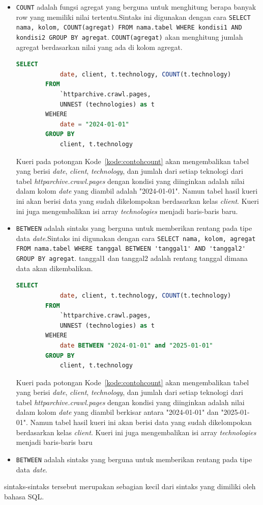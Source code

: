 \begin{itemize}
    \item \verb|COUNT| adalah fungsi agregat yang berguna untuk menghitung berapa banyak row yang memiliki nilai tertentu.Sintaks ini digunakan dengan cara \verb|SELECT nama, kolom, COUNT(agregat) FROM nama.tabel WHERE kondisi1 AND kondisi2 GROUP BY agregat|. \verb|COUNT(agregat)| akan menghitung jumlah agregat berdasarkan nilai yang ada di kolom agregat.
    \begin{lstlisting}[language=SQL, caption=contoh penggunaan sintaks \lstinline|COUNT|, label=kode:contohcount]
        SELECT
            date, client, t.technology, COUNT(t.technology)
        FROM
            `httparchive.crawl.pages,
            UNNEST (technologies) as t
        WEHERE
            date = "2024-01-01"
        GROUP BY
            client, t.technology
    \end{lstlisting}
     Kueri pada potongan Kode~\ref{kode:contohcount} akan mengembalikan tabel yang berisi \textit{date}, \textit{client}, \textit{technology}, dan jumlah dari setiap teknologi dari tabel \textit{httparchive.crawl.pages} dengan kondisi yang diinginkan adalah nilai dalam kolom \textit{date} yang diambil adalah "2024-01-01". Namun tabel hasil kueri ini akan berisi data yang sudah dikelompokan berdasarkan kelas \textit{client}. Kueri ini juga mengembalikan isi array \textit{technologies} menjadi baris-baris baru.
     
    \item \verb|BETWEEN| adalah sintaks yang berguna untuk memberikan rentang pada tipe data \textit{date}.Sintaks ini digunakan dengan cara \verb|SELECT nama, kolom, agregat FROM nama.tabel WHERE tanggal BETWEEN 'tanggal1' AND 'tanggal2' GROUP BY agregat|. tanggal1 dan tanggal2 adalah rentang tanggal dimana data akan dikembalikan.
    \begin{lstlisting}[language=SQL, caption=contoh penggunaan sintaks \lstinline|BETWEEN|, label=kode:contohbetween]
        SELECT
            date, client, t.technology, COUNT(t.technology)
        FROM
            `httparchive.crawl.pages,
            UNNEST (technologies) as t
        WEHERE
            date BETWEEN "2024-01-01" and "2025-01-01"
        GROUP BY
            client, t.technology
    \end{lstlisting}
    Kueri pada potongan Kode~\ref{kode:contohcount} akan mengembalikan tabel yang berisi \textit{date}, \textit{client}, \textit{technology}, dan jumlah dari setiap teknologi dari tabel \textit{httparchive.crawl.pages} dengan kondisi yang diinginkan adalah nilai dalam kolom \textit{date} yang diambil berkisar antara "2024-01-01" dan "2025-01-01". Namun tabel hasil kueri ini akan berisi data yang sudah dikelompokan berdasarkan kelas \textit{client}. Kueri ini juga mengembalikan isi array \textit{technologies} menjadi baris-baris baru
    \item \verb|BETWEEN| adalah sintaks yang berguna untuk memberikan rentang pada tipe data \textit{date}.
\end{itemize}
sintaks-sintaks tersebut merupakan sebagian kecil dari sintaks yang dimiliki oleh bahasa SQL.

